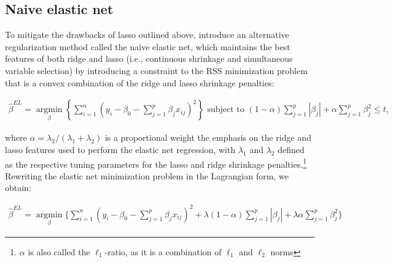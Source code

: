 \subsection{Naive elastic net}

\noindent To mitigate the drawbacks of lasso outlined above, \cite{zou2005regularization} introduce an alternative regularization method called the naive elastic net, which maintains the best features of both ridge and lasso (i.e., continuous shrinkage and simultaneous variable selection) by introducing a constraint to the RSS minimization problem that is a convex combination of the ridge and lasso shrinkage penalties: 

\begin{align}
\label{eqn:eqn8}
\hat{\beta}^{EL} = \underset{\beta}{\operatorname{argmin}}\left\{\sum_{i=1}^{n}\left(y_{i}-\beta_{0}-\sum_{j=1}^{p} \beta_{j} x_{i j}\right)^{2}\right\} \text { subject to } \left(1 - \alpha \right)\sum_{j=1}^{p}\left|\beta_{j}\right| + \alpha \sum_{j=1}^{p}\beta_{j}^{2} \leq t,
\end{align}

\noindent where $\alpha = \lambda_{2} / \left(\lambda_{1} + \lambda_{2}\right)$ is a proportional weight the emphasis on the ridge and lasso features used to perform the elastic net regression, with $\lambda_{1}$ and $\lambda_{2}$ defined as the respective tuning parameters for the lasso and ridge shrinkage penalties.\footnote{$\alpha$ is also called the $\ell_1$-ratio, as it is a combination of $\ell_1$ and $\ell_2$ norms} \\

\noindent Rewriting the elastic net minimization problem in the Lagrangian form, we obtain:

\begin{align}
\label{eqn:eq_elnet}
\hat{\beta}^{EL} = \underset{\beta}{\operatorname{argmin}}\Bigg\{\sum_{i=1}^{n}(y_{i}-\beta_{0}-\sum_{j=1}^{p} \beta_{j} x_{i j})^{2} + \lambda(1 - \alpha)\sum_{j=1}^{p}|\beta_{j}| + \lambda\alpha \sum_{j=1}^{p}\beta_{j}^{2} \Bigg\}
\end{align}


